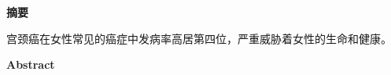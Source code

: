 \cleardoublepage{}
\begin{center}
    \bfseries {} 摘要
\end{center}

\par 宫颈癌在女性常见的癌症中发病率高居第四位，严重威胁着女性的生命和健康。

\cleardoublepage{}
\begin{center}
    \bfseries {} Abstract
\end{center}
